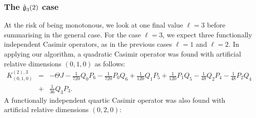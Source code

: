 \documentclass[12pt]{article}
\begin{document}
\subsubsection{The $\mathfrak{\Hat{g}}_{3}(2)$  case }\label{ECGA3}

At the risk of being monotonous, we look at one final value $\ell=3$ before
summarising in the general case. For the case $\ell=3$, we expect three functionally independent Casimir
operators, as in the previous cases $\ell=1$ and $\ell=2$. In applying our algorithm, a quadratic Casimir
operator  was found with artificial relative dimensions $(0, 1,0)$ as follows:
%
\begin{eqnarray}
K^{(2),3}_{(0,1,0)}&=&- \Theta J- \frac{1}{720} Q_{0} P_{6}- \frac{1}{720} P_{0} Q_{6}+ \frac{1}{120}Q_{1}P_{5}+\frac{1}{120}P_{1}Q_{5}-\frac{1}{48}Q_{2}P_{4}-\frac{1}{48}P_{2}Q_{4}\nonumber\\
 &+& \frac{1}{36}Q_{3}P_{3}.   \label{F2c}
\end{eqnarray}
A functionally independent quartic Casimir operator was also found with
artificial relative dimensions $(0, 2,0)$:
\end{document}
